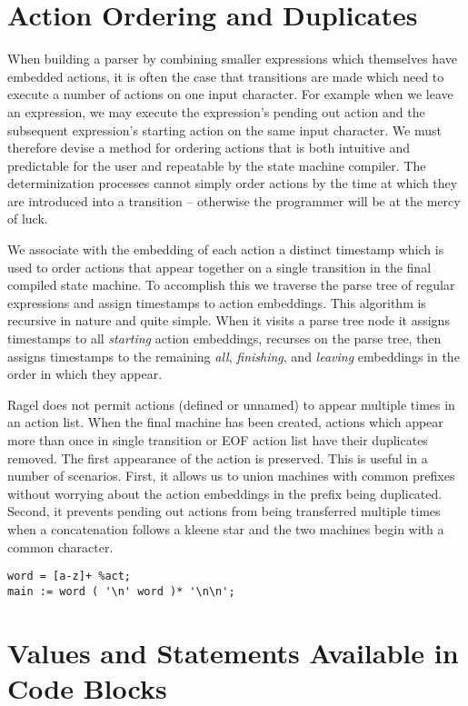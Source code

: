 \documentclass[letterpaper,11pt,oneside]{book}
\newcommand{\verbspace}{\vspace{10pt}}
\begin{document}
\section{Action Ordering and Duplicates}

When building a parser by combining smaller expressions which themselves have
embedded actions, it is often the case that transitions are made which need to
execute a number of actions on one input character. For example when we leave
an expression, we may execute the expression's pending out action and the
subsequent expression's starting action on the same input character.  We must
therefore devise a method for ordering actions that is both intuitive and
predictable for the user and repeatable by the state machine compiler. The
determinization processes cannot simply order actions by the time at which they
are introduced into a transition -- otherwise the programmer will be at the
mercy of luck.

We associate with the embedding of each action a distinct timestamp which is
used to order actions that appear together on a single transition in the final
compiled state machine. To accomplish this we traverse the parse tree of
regular expressions and assign timestamps to action embeddings. This algorithm
is recursive in nature and quite simple. When it visits a parse tree node it
assigns timestamps to all {\em starting} action embeddings, recurses on the
parse tree, then assigns timestamps to the remaining {\em all}, {\em
finishing}, and {\em leaving} embeddings in the order in which they appear.

Ragel does not permit actions (defined or unnamed) to appear multiple times in
an action list.  When the final machine has been created, actions which appear
more than once in single transition or EOF action list have their duplicates
removed. The first appearance of the action is preserved. This is useful in a
number of scenarios.  First, it allows us to union machines with common
prefixes without worrying about the action embeddings in the prefix being
duplicated.  Second, it prevents pending out actions from being transferred multiple times
when a concatenation follows a kleene star and the two machines begin with a common
character.

\verbspace
\begin{verbatim}
word = [a-z]+ %act;
main := word ( '\n' word )* '\n\n';
\end{verbatim}

\section{Values and Statements Available in Code Blocks}
\label{vals}
\end{document}
